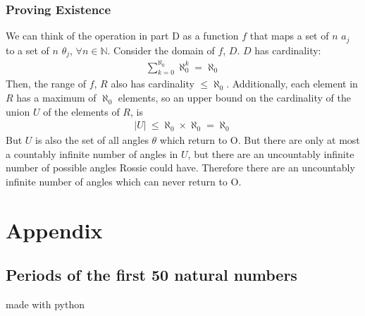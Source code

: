 \documentclass{article}
\begin{document}
  \subsubsection{Proving Existence}
  We can think of the operation in part D as a function $f$ that maps a set of $n$ $a_j$ to a set of $n$ $\theta_j$, $\forall n \in \mathbb{N}$. Consider the domain of $f$, $D$. $D$ has cardinality:
  \begin{align}
    \sum^{\aleph_0}_{k=0}\aleph_0^k = \aleph_0
  \end{align}
  Then, the range of $f$, $R$ also has cardinality $\leq \aleph_0$. Additionally, each element in $R$ has a maximum of $\aleph_0$ elements, so an upper bound on the cardinality of the union $U$ of the elements of $R$, is
  \begin{align}
    \rvert U \lvert \  \leq \aleph_0 \times \aleph_0 = \aleph_0
  \end{align}
  But $U$ is also the set of all angles $\theta$ which return to O. But there are only at most a countably infinite number of angles in $U$, but there are an uncountably infinite number of possible angles Rossie could have. Therefore there are an uncountably infinite number of angles which can never return to O.
  \section{Appendix}
  \subsection{Periods of the first 50 natural numbers }
  made with python
\end{document}
